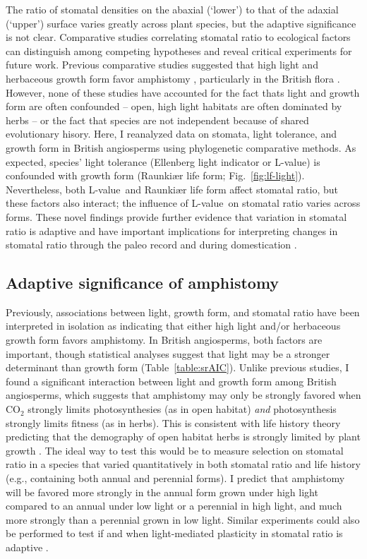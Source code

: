 \documentclass[12pt, oneside]{article}
\newcommand{\el}{L-value}
\begin{document}
The ratio of stomatal densities on the abaxial (`lower') to that of the adaxial (`upper') surface varies greatly across plant species, but the adaptive significance is not clear. Comparative studies correlating stomatal ratio to ecological factors can distinguish among competing hypotheses and reveal critical experiments for future work. Previous comparative studies suggested that high light and herbaceous growth form favor amphistomy \citep{Mott_etal_1982, Jordan_etal_2014, Muir_2015, Bucher_etal_2017}, particularly in the British flora \citep{Salisbury_1927, Peat_Fitter_1994b}. However, none of these studies have accounted for the fact thats light and growth form are often confounded -- open, high light habitats are often dominated by herbs -- or the fact that species are not independent because of shared evolutionary hisory. Here, I reanalyzed data on stomata, light tolerance, and growth form in British angiosperms using phylogenetic comparative methods. As expected, species' light tolerance (Ellenberg light indicator or \el) is confounded with growth form (Raunki\ae r life form; Fig.~\ref{fig:lf-light}). Nevertheless, both \el~and Raunki\ae r life form affect stomatal ratio, but these factors also interact; the influence of \el~on stomatal ratio varies across forms. These novel findings provide further evidence that variation in stomatal ratio is adaptive and have important implications for interpreting changes in stomatal ratio through the paleo record \citep{Jordan_etal_2014} and during domestication \citep{Milla_etal_2013}.

\subsection*{Adaptive significance of amphistomy}

Previously, associations between light, growth form, and stomatal ratio have been interpreted in isolation as indicating that either high light and/or herbaceous growth form favors amphistomy. In British angiosperms, both factors are important, though statistical analyses suggest that light may be a stronger determinant than growth form (Table~\ref{table:srAIC}). Unlike previous studies, I found a significant interaction between light and growth form among British angiosperms, which suggests that amphistomy may only be strongly favored when CO$_2$ strongly limits photosynthesies (as in open habitat) \textit{and} photosynthesis strongly limits fitness (as in herbs). This is consistent with life history theory predicting that the demography of open habitat herbs is strongly limited by plant growth \citep{Franco_Silvertown_1996}. The ideal way to test this would be to measure selection on stomatal ratio in a species that varied quantitatively in both stomatal ratio and life history (e.g., containing both annual and perennial forms). I predict that amphistomy will be favored more strongly in the annual form grown under high light compared to an annual under low light or a perennial in high light, and much more strongly than a perennial grown in low light. Similar experiments could also be performed to test if and when light-mediated plasticity in stomatal ratio is adaptive \citep{Gay_Hurd_1975, Mott_Michaelson_1991}.
\end{document}
